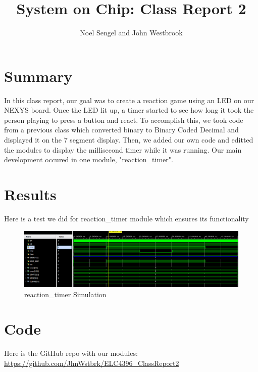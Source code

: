 \documentclass[11pt]{article}
\begin{document}
\title{System on Chip: Class Report 2}
\author{Noel Sengel and John Westbrook}

\maketitle


\section*{Summary}

In this class report, our goal was to create a reaction game using an LED on our NEXYS board. Once the LED lit up, a timer started to see how long it took the person playing to press a button and react. To accomplish this, we took code from a previous class which converted binary to Binary Coded Decimal and displayed it on the 7 segment display. Then, we added our own code and editted the modules to display the millisecond timer while it was running. Our main development occured in one module, "reaction\_timer".


\section*{Results}

Here is a test we did for reaction\_timer module which ensures its functionality
\begin{figure}[ht]\centering
	\includegraphics[width=\textwidth]{image_2023-09-14_215312515.png}
	\caption{reaction\_timer Simulation}
	\label{fig1}
\end{figure}


\section*{Code}

Here is the GitHub repo with our modules: 
\url{https://github.com/JhnWstbrk/ELC4396_ClassReport2}
\end{document}
